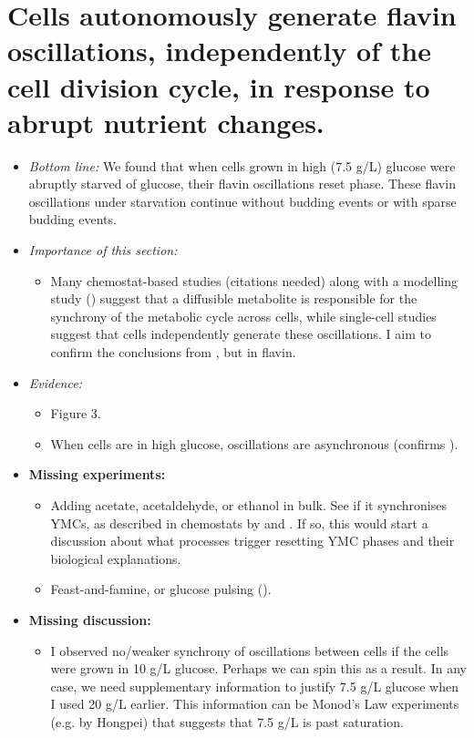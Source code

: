 \section{Cells autonomously generate flavin oscillations, independently of the cell division cycle, in response to abrupt nutrient changes.}
\label{sec:biology-abrupt}

\begin{itemize}
\item \emph{Bottom line:} We found that when cells grown in high (7.5 g/L) glucose were abruptly starved of glucose, their flavin oscillations reset phase.  These flavin oscillations under starvation continue without budding events or with sparse budding events.
\item \emph{Importance of this section:}

\begin{itemize}
\item Many chemostat-based studies (citations needed) along with a modelling study (\cite{krishnaMinimalPushPull2018}) suggest that a diffusible metabolite is responsible for the synchrony of the metabolic cycle across cells, while single-cell studies suggest that cells independently generate these oscillations.  I aim to confirm the conclusions from \cite{papagiannakisAutonomousMetabolicOscillations2017}, but in flavin.
\end{itemize}
\item \emph{Evidence:}
\begin{itemize}
\item Figure 3.
\item When cells are in high glucose, oscillations are asynchronous (confirms \cite{papagiannakisAutonomousMetabolicOscillations2017,baumgartnerFlavinbasedMetabolicCycles2018}).
\end{itemize}

\item \textbf{Missing experiments:}
\begin{itemize}
\item Adding acetate, acetaldehyde, or ethanol in bulk.  See if it synchronises YMCs, as described in chemostats by \cite{kuangMsn2RegulateExpression2017} and \cite{krishnaMinimalPushPull2018} .  If so, this would start a discussion about what processes trigger resetting YMC phases and their biological explanations.
\item Feast-and-famine, or glucose pulsing (\cite{charvinForcedPeriodicExpression2009}).
\end{itemize}
\item \textbf{Missing discussion:}
\begin{itemize}
\item I observed no/weaker synchrony of oscillations between cells if the cells were grown in 10 g/L glucose.  Perhaps we can spin this as a result.  In any case, we need supplementary information to justify 7.5 g/L glucose when I used 20 g/L earlier.  This information can be Monod's Law experiments (e.g. by Hongpei) that suggests that 7.5 g/L is past saturation.
\end{itemize}
\end{itemize}

